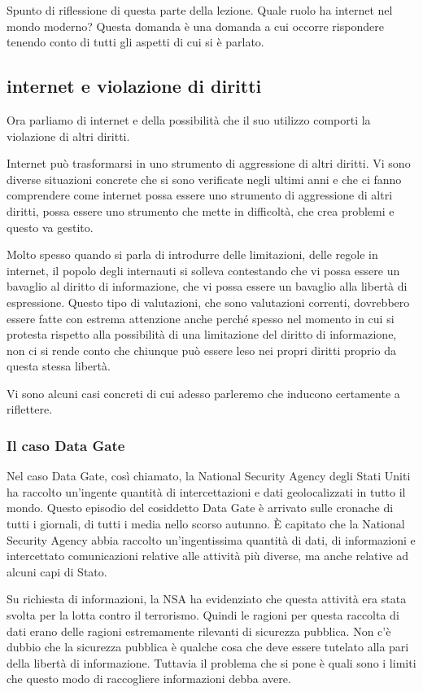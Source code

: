Spunto di riflessione di questa parte della lezione. Quale ruolo ha internet nel mondo moderno? Questa domanda è una domanda a cui occorre rispondere tenendo conto di tutti gli aspetti di cui si è parlato.

\subsection{internet e violazione di diritti}

Ora parliamo di internet e della possibilità che il suo utilizzo comporti la violazione di altri diritti.

Internet può trasformarsi in uno strumento di aggressione di altri diritti. Vi sono diverse situazioni concrete che si sono verificate negli ultimi anni e che ci fanno comprendere come internet possa essere uno strumento di aggressione di altri diritti, possa essere uno strumento che mette in difficoltà, che crea problemi e questo va gestito.

Molto spesso quando si parla di introdurre delle limitazioni, delle regole in internet, il popolo degli internauti si solleva contestando che vi possa essere un bavaglio al diritto di informazione, che vi possa essere un bavaglio alla libertà di espressione. Questo tipo di valutazioni, che sono valutazioni correnti, dovrebbero essere fatte con estrema attenzione anche perché spesso nel momento in cui si protesta rispetto alla possibilità di una limitazione del diritto di informazione, non ci si rende conto che chiunque può essere leso nei propri diritti proprio da questa stessa libertà.

Vi sono alcuni casi concreti di cui adesso parleremo che inducono certamente a riflettere. 

\subsubsection{Il caso Data Gate}
Nel caso Data Gate, così chiamato, la National Security Agency degli Stati Uniti ha raccolto un'ingente quantità di intercettazioni e dati geolocalizzati in tutto il mondo. Questo episodio del cosiddetto Data Gate è arrivato sulle cronache di tutti i giornali, di tutti i media nello scorso autunno. È capitato che la National Security Agency abbia raccolto un'ingentissima quantità di dati, di informazioni e intercettato comunicazioni relative alle attività più diverse, ma anche relative ad alcuni capi di Stato.

Su richiesta di informazioni, la NSA ha evidenziato che questa attività era stata svolta per la lotta contro il terrorismo. Quindi le ragioni per questa raccolta di dati erano delle ragioni estremamente rilevanti di sicurezza pubblica. Non c'è dubbio che la sicurezza pubblica è qualche cosa che deve essere tutelato alla pari della libertà di informazione. Tuttavia il problema che si pone è quali sono i limiti che questo modo di raccogliere informazioni debba avere.

